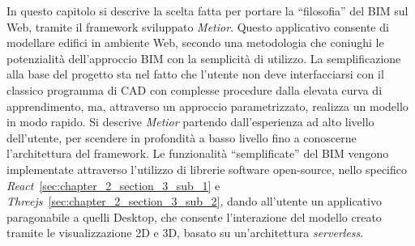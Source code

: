 In questo capitolo si descrive la scelta fatta per portare la ``filosofia'' del BIM sul Web, tramite il framework sviluppato
\emph{Metior}.
Questo applicativo consente di modellare edifici in ambiente Web, secondo una metodologia che coniughi le potenzialità
dell’approccio BIM con la semplicità di utilizzo.
La semplificazione alla base del progetto sta nel fatto che l'utente non deve interfacciarsi con il classico programma
di CAD con complesse procedure dalla elevata curva di apprendimento, ma, attraverso un approccio parametrizzato,
realizza un modello in modo rapido.
Si descrive \emph{Metior} partendo dall'esperienza ad alto livello dell'utente, per scendere in profondità
a basso livello fino a conoscerne l'architettura del framework.
Le funzionalità ``semplificate'' del BIM vengono implementate attraverso l'utilizzo di librerie software open-source,
nello specifico \emph{React}~\ref{sec:chapter_2_section_3_sub_1}
 e \emph{Threejs}~\ref{sec:chapter_2_section_3_sub_2}, dando all'utente un applicativo paragonabile a quelli
Desktop, che consente l'interazione del modello creato tramite le visualizzazione 2D e 3D, basato su un'architettura \emph{serverless}.
\newpage
